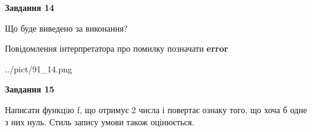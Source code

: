 \documentclass[11pt, ukrainian]{article}
\begin{document}
{\begin {large}
{\begin {center}\textbf{Завдання 14}\end {center}}\par
Що буде виведено за виконання? \par
Повідомлення інтерпретатора про помилку позначати \textbf{error}

\begin{center}
	{../pict/91_14.png}
\end{center}
\newpage

{\begin {center}\textbf{Завдання 15}\end {center}}\par

Написати функцiю f, що отримує 2 числа і повертає ознаку того, що хоча б одне з них нуль. Стиль запису умови також оцінюється.\par
\newpage

\end {large}}
\end{document}
